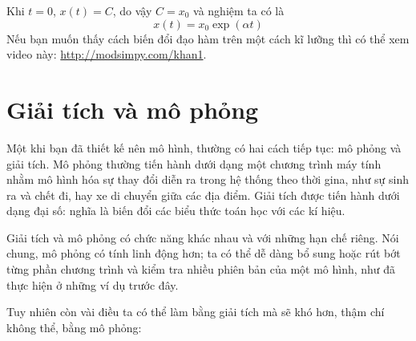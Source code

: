 \documentclass[12pt]{book}
\theoremstyle{exercise}
\begin{document}
Khi $t=0$, $x(t) = C$, do vậy $C = x_0$ và nghiệm ta có là
%
\[ x(t) = x_0 \exp(\alpha t) \]
%
Nếu bạn muốn thấy cách biến đổi đạo hàm trên một cách kĩ lưỡng thì có thể xem video này: \url{http://modsimpy.com/khan1}.



\section{Giải tích và mô phỏng}

Một khi bạn đã thiết kế nên mô hình, thường có hai cách tiếp tục: mô phỏng và giải tích. Mô phỏng thường tiến hành dưới dạng một chương trình máy tính nhằm mô hình hóa sự thay đổi diễn ra trong hệ thống theo thời gina, như sự sinh ra và chết đi, hay xe di chuyển giữa các địa điểm. Giải tích được tiến hành dưới dạng đại số: nghĩa là biến đổi các biểu thức toán học với các kí hiệu.


Giải tích và mô phỏng có chức năng khác nhau và với những hạn chế riêng. Nói chung, mô phỏng có tính linh động hơn; ta có thể dễ dàng bổ sung hoặc rút bớt từng phần chương trình và kiểm tra nhiều phiên bản của một mô hình, như đã thực hiện ở những ví dụ trước đây.

Tuy nhiên còn vài điều ta có thể làm bằng giải tích mà sẽ khó hơn, thậm chí không thể, bằng mô phỏng:
\end{document}
